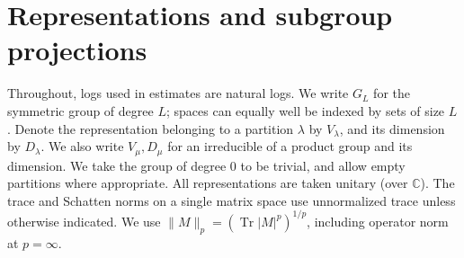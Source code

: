 \section{Representations and subgroup projections}\label{sec:conventions}
Throughout, logs used in estimates are natural logs. We write \(G_L\) for the symmetric group of degree \(L\); spaces can equally well be indexed by sets of size \(L\). Denote the representation belonging to a partition \(\lambda\) by \(V_\lambda\), and its dimension by \(D_\lambda\). We also write \(V_\mu,D_\mu\) for an irreducible of a product group and its dimension. We take the group of degree 0 to be trivial, and allow empty partitions where appropriate. All representations are taken unitary (over \(\mathbb C\)). The trace and Schatten norms on a single matrix space use unnormalized trace unless otherwise indicated. We use \(\|M\|_p=(\operatorname{Tr}|M|^p)^{1/p}\), including operator norm at \(p=\infty\).

